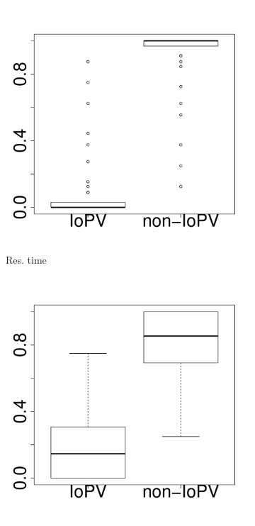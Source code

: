 \begin{figure}[t]
	\centering
        \begin{subfigure}{0.19\textwidth}
                \includegraphics[width=\linewidth]{Figures/runtime-hadoop-boxplot.pdf}
                \caption{Res. time}
        \end{subfigure}%
        \begin{subfigure}{0.19\textwidth}
                \includegraphics[width=\linewidth]{Figures/cpu-hadoop-boxplot.pdf}

\end{subfigure}
\end{figure}
